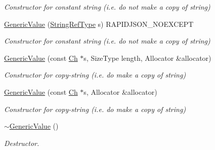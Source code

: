 \begin{DoxyCompactItemize}
\begin{DoxyCompactList}\small\item\em Constructor for constant string (i.\+e. do not make a copy of string) \end{DoxyCompactList}\item 
\mbox{\label{classGenericValue_abb2887958974fef1b2b5c8e32cc72ddb}} 
\hyperlink{classGenericValue_abb2887958974fef1b2b5c8e32cc72ddb}{Generic\+Value} (\hyperlink{classGenericValue_a32e0f30ee278072374c8168b14d3317f}{String\+Ref\+Type} s) R\+A\+P\+I\+D\+J\+S\+O\+N\+\_\+\+N\+O\+E\+X\+C\+E\+PT
\begin{DoxyCompactList}\small\item\em Constructor for constant string (i.\+e. do not make a copy of string) \end{DoxyCompactList}\item 
\mbox{\label{classGenericValue_a9ec2c7cda8c8845acfa3565c6b1b4e10}} 
\hyperlink{classGenericValue_a9ec2c7cda8c8845acfa3565c6b1b4e10}{Generic\+Value} (const \hyperlink{classGenericValue_ade0e0ce64ccd5d852da57a35e720bafb}{Ch} $\ast$s, Size\+Type length, Allocator \&allocator)
\begin{DoxyCompactList}\small\item\em Constructor for copy-\/string (i.\+e. do make a copy of string) \end{DoxyCompactList}\item 
\mbox{\label{classGenericValue_a9b72b2e3347d4cd77b16c3b45e8decf1}} 
\hyperlink{classGenericValue_a9b72b2e3347d4cd77b16c3b45e8decf1}{Generic\+Value} (const \hyperlink{classGenericValue_ade0e0ce64ccd5d852da57a35e720bafb}{Ch} $\ast$s, Allocator \&allocator)
\begin{DoxyCompactList}\small\item\em Constructor for copy-\/string (i.\+e. do make a copy of string) \end{DoxyCompactList}\item 
\hyperlink{classGenericValue_a213ba89ef5ef961a5e655bd8c78ac9f4}{$\sim$\+Generic\+Value} ()
\begin{DoxyCompactList}\small\item\em Destructor. \end{DoxyCompactList}\item 
\mbox{\label{classGenericValue_ab0205d57176d83814ea4e4598c596fe8}} 

\end{DoxyCompactItemize}
